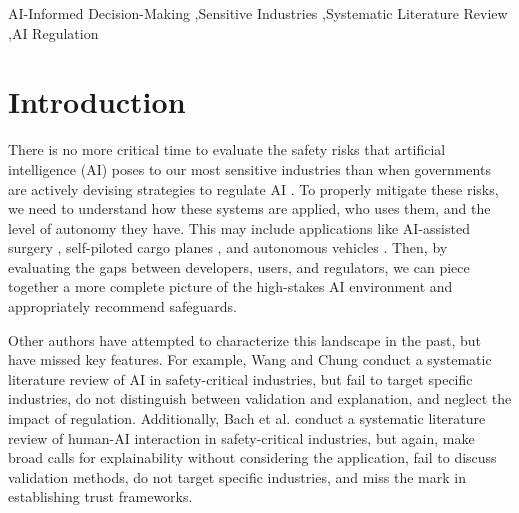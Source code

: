 \documentclass[authoryear,preprint,12pt]{elsarticle}
\begin{document}
\begin{frontmatter}
\begin{abstract}
\textit{This work was funded by both the U.S. Nuclear Regulatory Commission and the U.S.
National Science Foundation.}
\end{abstract}



\begin{keyword}
AI-Informed Decision-Making \sep Sensitive Industries \sep Systematic Literature
Review \sep AI Regulation

\end{keyword}

\end{frontmatter}

\section{Introduction}
There is no more critical time to evaluate the safety risks that artificial
intelligence (AI) poses to our most sensitive industries than when governments
are actively devising strategies to regulate AI \cite{whitehouse}. To properly
mitigate these risks, we need to understand how these systems are applied, who
uses them, and the level of autonomy they have. This may include applications
like AI-assisted surgery \cite{shhadehContributionRealtimeArtificial2025},
self-piloted cargo planes \cite{mossBayesianSafetyValidation2024}, and
autonomous vehicles \cite{luPhysicsinformedAttentionModel2025}. Then, by
evaluating the gaps between developers, users, and regulators, we can piece
together a more complete picture of the high-stakes AI environment and
appropriately recommend safeguards. 

Other authors have attempted to characterize this landscape in the past, but
have missed key features. For example, Wang and Chung
\cite{wangArtificialIntelligenceSafetycritical2021} conduct a systematic
literature review of AI in safety-critical industries, but fail to target
specific industries, do not distinguish between validation and explanation, and
neglect the impact of regulation. Additionally, Bach et al.
\cite{bachUnpackingHumanAIInteraction2024} conduct a systematic literature
review of human-AI interaction in safety-critical industries, but again, make
broad calls for explainability without considering the application, fail to
discuss validation methods, do not target specific industries, and miss the mark
in establishing trust frameworks.
\end{document}

